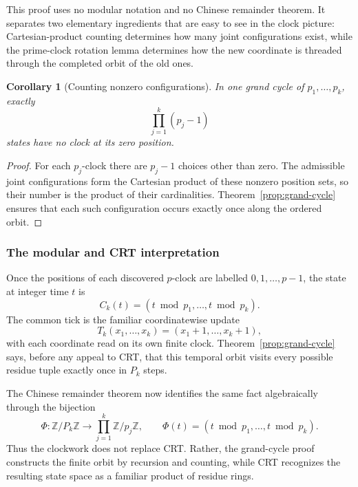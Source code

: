 \documentclass[11pt,a4paper]{article}
\theoremstyle{clockplain}
\newtheorem{corollary}[proposition]{Corollary}
\theoremstyle{definition}
\theoremstyle{remark}
\newcommand{\Z}{\mathbb Z}
\begin{document}
This proof uses no modular notation and no Chinese remainder theorem.  It separates two elementary ingredients that are easy to see in the clock picture: Cartesian-product counting determines how many joint configurations exist, while the prime-clock rotation lemma determines how the new coordinate is threaded through the completed orbit of the old ones.

\begin{corollary}[Counting nonzero configurations]
\label{cor:grand-cycle-survivors}
In one grand cycle of $p_1,\ldots,p_k$, exactly
\begin{equation}
\prod_{j=1}^k(p_j-1)
\label{eq:grand-cycle-survivors}
\end{equation}
states have no clock at its zero position.
\end{corollary}

\begin{proof}
For each $p_j$-clock there are $p_j-1$ choices other than zero.  The admissible joint configurations form the Cartesian product of these nonzero position sets, so their number is the product of their cardinalities.  Theorem~\ref{prop:grand-cycle} ensures that each such configuration occurs exactly once along the ordered orbit.
\end{proof}

\subsubsection{The modular and CRT interpretation}
Once the positions of each discovered $p$-clock are labelled $0,1,\ldots,p-1$, the state at integer time $t$ is
\begin{equation}
C_k(t)=(t\bmod p_1,\ldots,t\bmod p_k).
\label{eq:jointstate}
\end{equation}
The common tick is the familiar coordinatewise update
\begin{equation}
T_k(x_1,\ldots,x_k)=(x_1+1,\ldots,x_k+1),
\label{eq:update}
\end{equation}
with each coordinate read on its own finite clock.  Theorem~\ref{prop:grand-cycle} says, before any appeal to CRT, that this temporal orbit visits every possible residue tuple exactly once in $P_k$ steps.

The Chinese remainder theorem now identifies the same fact algebraically through the bijection
\begin{equation}
\Phi:\Z/P_k\Z\longrightarrow\prod_{j=1}^k\Z/p_j\Z,
\qquad
\Phi(t)=(t\bmod p_1,\ldots,t\bmod p_k).
\label{eq:crt-map}
\end{equation}
Thus the clockwork does not replace CRT.  Rather, the grand-cycle proof constructs the finite orbit by recursion and counting, while CRT recognizes the resulting state space as a familiar product of residue rings.
\end{document}
